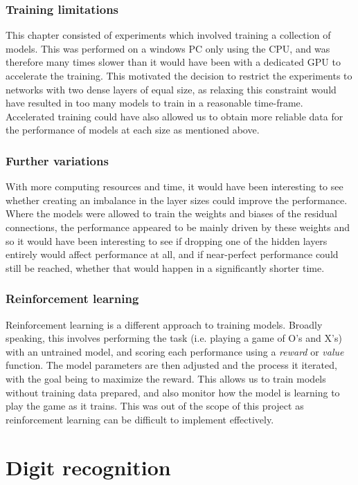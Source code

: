 \documentclass{somasmsc}
\begin{document}
\subsection{Training limitations}

This chapter consisted of experiments which involved training a collection of models. This was performed on a windows PC only using the CPU, and was therefore many times slower than it would have been with a dedicated GPU to accelerate the training. This motivated the decision to restrict the experiments to networks with two dense layers of equal size, as relaxing this constraint would have resulted in too many models to train in a reasonable time-frame. Accelerated training could have also allowed us to obtain more reliable data for the performance of models at each size as mentioned above.

\subsection{Further variations}

With more computing resources and time, it would have been interesting to see whether creating an imbalance in the layer sizes could improve the performance. Where the models were allowed to train the weights and biases of the residual connections, the performance appeared to be mainly driven by these weights and so it would have been interesting to see if dropping one of the hidden layers entirely would affect performance at all, and if near-perfect performance could still be reached, whether that would happen in a significantly shorter time.

\subsection{Reinforcement learning}

Reinforcement learning is a different approach to training models. Broadly speaking, this involves performing the task (i.e. playing a game of O's and X's) with an untrained model, and scoring each performance using a \textit{reward} or \textit{value} function. The model parameters are then adjusted and the process it iterated, with the goal being to maximize the reward. This allows us to train models without training data prepared, and also monitor how the model is learning to play the game as it trains. This was out of the scope of this project as reinforcement learning can be difficult to implement effectively.

\chapter{Digit recognition}
\end{document}
